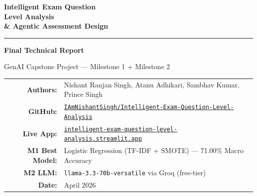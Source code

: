 \documentclass[12pt,a4paper]{article}
\begin{document}
\begin{titlepage}
  \centering\vspace*{0.8cm}


  \vspace{0.8cm}
  {\Huge\bfseries\color{gold}
    Intelligent Exam Question\\[0.4em]
    Level Analysis\\[0.4em]
    \& Agentic Assessment Design\par}
  \vspace{0.5cm}
  \textcolor{mgray}{\rule{1\linewidth}{0.45pt}}
  \vspace{2cm}
  {\LARGE\bfseries Final Technical Report\par}
  {\large\color{mgray}GenAI Capstone Project --- Milestone 1 + Milestone 2\par}

  \vspace{1.4cm}
  \begin{tabular}{rl}
    \textbf{Authors:}       & Nishant Ranjan Singh, Atanu Adhikari,
                              Sambhav Kumar, Prince Singh \\[4pt]
    \textbf{GitHub:}        & \href{https://github.com/IAmNishantSingh/Intelligent-Exam-Question-Level-Analysis}%
                              {\small\texttt{IAmNishantSingh/Intelligent-Exam-Question-Level-Analysis}} \\[4pt]
    \textbf{Live App:}      & \href{https://intelligent-exam-question-level-analysis.streamlit.app/}%
                              {\small\texttt{intelligent-exam-question-level-analysis.streamlit.app}} \\[4pt]
    \textbf{M1 Best Model:} & Logistic Regression (TF-IDF + SMOTE) --- 71.00\% Macro Accuracy \\[4pt]
    \textbf{M2 LLM:}        & \texttt{llama-3.3-70b-versatile} via Groq (free-tier) \\[4pt]
    \textbf{Date:}          & April 2026 \\
  \end{tabular}


\end{titlepage}
\end{document}

